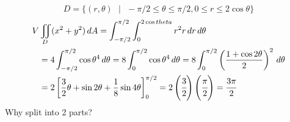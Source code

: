 \documentclass{article}
\begin{document}
\[D = \{ (r, \theta) \text{ } | \text{ } -\pi / 2 \le \theta \le \pi / 2 , 0 \le r \le 2 \cos{\theta } \} \]
\begin{equation*}
  \begin{split}
    V & \iint \limits_{D } (x^2 + y ^2 ) \, dA =  \int_{ -\pi /2 }^{\pi /2  } \int_{0}^{2 \cos{theta }} r^2 r \, dr \, d \theta \\ 
      & = 4 \int_{-\pi / 2  }^{\pi / 2  } \cos{\theta}^4 \, d\theta = 8 \int_0^{\pi / 2 } \cos{\theta}^4 \, d\theta = 8 \int_0^{\pi / 2} \left( \frac{1 + \cos{2\theta}}{2 } \right)^2 \, d\theta \\ 
      & = 2 \left[ \frac{3}{2} \theta + \sin{2\theta}  + \frac{1}{8} \sin{4\theta}\right]_0^{\pi / 2  } = 2 \left( \cfrac{3 }{2 }  \right) \left( \cfrac{\pi }{2 } \right) = \cfrac{3 \pi }{2 } 
  \end{split}
\end{equation*}
Why split into 2 parts?
\end{document}
